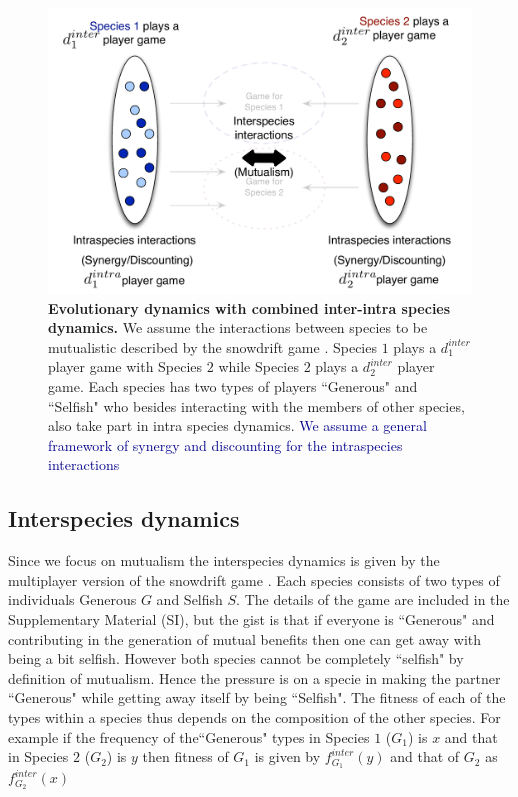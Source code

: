 \documentclass{pnastwo}
\newcommand{\cha}[1]{\textcolor{darkblue}{#1}}
\begin{document}
\begin{article}
\begin{figure}[h]
\begin{center}
\includegraphics[width=\columnwidth]{../Figures/interintra.pdf}
\caption{
\textbf{Evolutionary dynamics with combined inter-intra species dynamics.}
We assume the interactions between species to be mutualistic described by the snowdrift game \cite{bergstrom:PNAS:2003,souza:JTB:2009,gokhale:PRSB:2012}.
Species $1$ plays a $d_1^{inter}$ player game with Species $2$ while Species $2$ plays a $d_2^{inter}$ player game.
Each species has two types of players ``Generous" and ``Selfish" who besides interacting with the members of other species, also take part in intra species dynamics.
\cha{We assume a general framework of synergy and discounting for the intraspecies interactions \cite{eshel:AmNat:19
88,hauert:JTB:2006a}
}}
\end{center}
\end{figure}



\subsection{Interspecies dynamics}

Since we focus on mutualism the interspecies dynamics is given by the multiplayer version of the snowdrift game \cite{bergstrom:PNAS:2003,souza:JTB:2009,gokhale:PRSB:2012}.
Each species consists of two types of individuals Generous $G$ and Selfish $S$. 
The details of the game are included in the Supplementary Material (SI), but the gist is that if everyone is ``Generous" and contributing in the generation of mutual benefits then one can get away with being a bit selfish. However both species cannot be completely ``selfish" by definition of mutualism.
Hence the pressure is on a specie in making the partner ``Generous" while getting away itself by being ``Selfish".
The fitness of each of the types within a species thus depends on the composition of the other species.
For example if the frequency of the``Generous" types in Species $1$ ($G_1$) is $x$ and that in Species $2$ ($G_2$) is $y$ then fitness of $G_1$  is given by $f^{inter}_{G_1} (y)$ and that of $G_2$ as $f^{inter}_{G_2} (x)$


\end{article}
\end{document}
